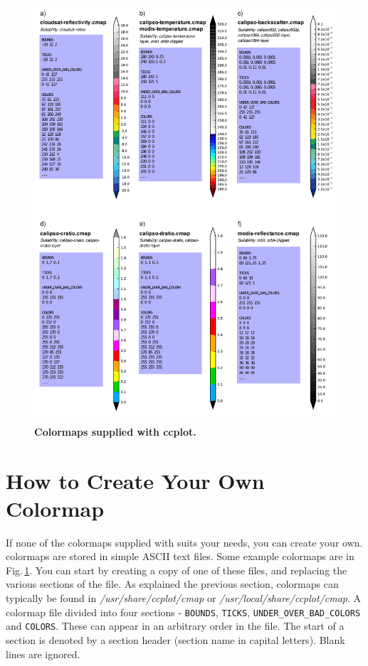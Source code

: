 \begin{figure}[p]
\includegraphics[width=\textwidth]{images/colormaps.pdf}
\caption[Colormaps supplied with ccplot]{\textbf{Colormaps supplied with ccplot.}}
\label{fig:colormaps}
\end{figure}

\section{How to Create Your Own Colormap}\label{sec:colormaps}

If none of the colormaps supplied with \ccplot suits your needs, you can create
your own. \ccplot colormaps are stored in simple ASCII text files. Some example
colormaps are in Fig.\,\ref{fig:colormaps}. You can start by creating a copy of
one of these
files, and replacing the various sections of the file. As explained the previous
section, colormaps can typically be found in \textit{/usr/share/ccplot/cmap}
or \textit{/usr/local/share/ccplot/cmap}. A colormap file divided into four sections
- \texttt{BOUNDS}, \texttt{TICKS}, \texttt{UNDER\_OVER\_BAD\_COLORS} and
\texttt{COLORS}. These can appear in an arbitrary order in the file. The start
of a section
is denoted by a section header (section name in capital letters). Blank lines
are
ignored.

